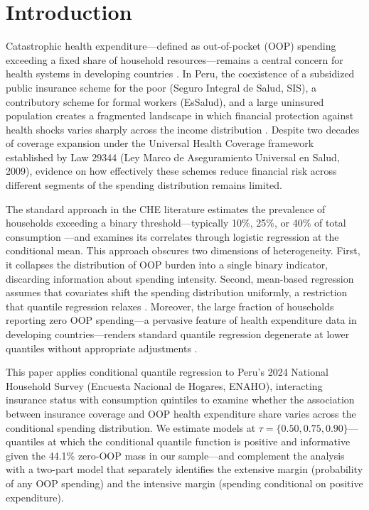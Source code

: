 \section{Introduction}\label{sec:intro}

Catastrophic health expenditure---defined as out-of-pocket (OOP) spending exceeding a fixed share of household resources---remains a central concern for health systems in developing countries \citep{Xu2003, Wagstaff2003}. In Peru, the coexistence of a subsidized public insurance scheme for the poor (Seguro Integral de Salud, SIS), a contributory scheme for formal workers (EsSalud), and a large uninsured population creates a fragmented landscape in which financial protection against health shocks varies sharply across the income distribution \citep{Petrera2013, Francke2013}. Despite two decades of coverage expansion under the Universal Health Coverage framework established by Law 29344 (Ley Marco de Aseguramiento Universal en Salud, 2009), evidence on how effectively these schemes reduce financial risk across different segments of the spending distribution remains limited.

The standard approach in the CHE literature estimates the prevalence of households exceeding a binary threshold---typically 10\%, 25\%, or 40\% of total consumption \citep{Xu2003}---and examines its correlates through logistic regression at the conditional mean. This approach obscures two dimensions of heterogeneity. First, it collapses the distribution of OOP burden into a single binary indicator, discarding information about spending intensity. Second, mean-based regression assumes that covariates shift the spending distribution uniformly, a restriction that quantile regression relaxes \citep{Koenker1978, Koenker2005}. Moreover, the large fraction of households reporting zero OOP spending---a pervasive feature of health expenditure data in developing countries---renders standard quantile regression degenerate at lower quantiles without appropriate adjustments \citep{Powell1986, Manning1987}.

This paper applies conditional quantile regression to Peru's 2024 National Household Survey (Encuesta Nacional de Hogares, ENAHO), interacting insurance status with consumption quintiles to examine whether the association between insurance coverage and OOP health expenditure share varies across the conditional spending distribution. We estimate models at $\tau = \{0.50, 0.75, 0.90\}$---quantiles at which the conditional quantile function is positive and informative given the 44.1\% zero-OOP mass in our sample---and complement the analysis with a two-part model that separately identifies the extensive margin (probability of any OOP spending) and the intensive margin (spending conditional on positive expenditure).

